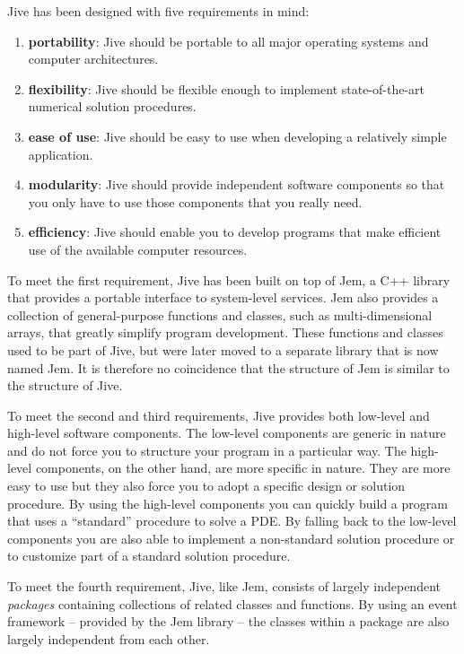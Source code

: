 Jive has been designed with five requirements in mind:
\begin{enumerate}

\item \textbf{portability}: Jive should be portable to all major
  operating systems and computer architectures.

\item \textbf{flexibility}: Jive should be flexible enough to implement
  state-of-the-art numerical solution procedures.

\item \textbf{ease of use}: Jive should be easy to use when developing a
  relatively simple application.

\item \textbf{modularity}: Jive should provide independent software
  components so that you only have to use those components that you
  really need.

\item \textbf{efficiency}: Jive should enable you to develop programs
  that make efficient use of the available computer resources.

\end{enumerate}
To meet the first requirement, Jive has been built on top of Jem, a C++
library that provides a portable interface to system-level services. Jem
also provides a collection of general-purpose functions and classes, such
as multi-dimensional arrays, that greatly simplify program development.
These functions and classes used to be part of Jive, but were later moved
to a separate library that is now named Jem. It is therefore no
coincidence that the structure of Jem is similar to the structure of
Jive.

To meet the second and third requirements, Jive provides both low-level
and high-level software components. The low-level components are generic
in nature and do not force you to structure your program in a particular
way. The high-level components, on the other hand, are more specific
in nature. They are more easy to use but they also force you to adopt a
specific design or solution procedure. By using the high-level components
you can quickly build a program that uses a ``standard'' procedure to
solve a PDE. By falling back to the low-level components you are also
able to implement a non-standard solution procedure or to customize part
of a standard solution procedure.

To meet the fourth requirement, Jive, like Jem, consists of largely
independent \emph{packages} containing collections of related classes and
functions. By using an event framework -- provided by the Jem library --
the classes within a package are also largely independent from each
other.

